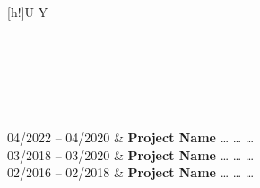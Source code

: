 \begin{xltabular}{\textwidth}[h!]{U Y}

 \hrulefill \\ \\ 
\endfirsthead

 \hrulefill \\ \\ 
\endhead

04/2022 – %
04/2020 			&	\textbf{Project Name} \newline
						\dots \newline
						\dots \newline
						\dots \newline
						\\
					
03/2018 – %
03/2020 			&	\textbf{Project Name} \newline
						\dots \newline
						\dots \newline
						\dots \newline
						\\
					
02/2016 – %
02/2018 			&	\textbf{Project Name} \newline
						\dots \newline
						\dots \newline
						\dots \newline
						\\

\end{xltabular}